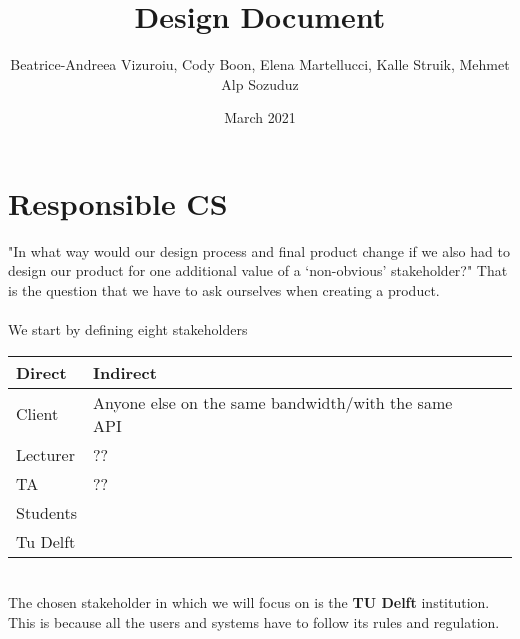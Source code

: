 \documentclass{article}
\title{Design Document}
\author{Beatrice-Andreea Vizuroiu, Cody Boon, Elena Martellucci, Kalle Struik, Mehmet Alp Sozuduz }
\date{March 2021}
\begin{document}
\maketitle

\section{Responsible CS}
"In what way would our design process and final product change if we also had to design our product for one additional value of a ‘non-obvious’ stakeholder?" That is the question that we have to ask ourselves when creating a product.\\
\\We start by defining eight stakeholders\\
\begin{center}
    \begin{tabular}{ | l | l | l | l | l |}
    \hline
    Direct    & Indirect \\ \hline \hline
    Client  & Anyone else on the same bandwidth/with the same API  \\ \hline
    Lecturer  &??  \\ \hline
    TA  &??  \\ \hline
    Students  &   \\ \hline
    Tu Delft  &   \\ \hline
    \end{tabular}
\end{center}

\\ The chosen stakeholder in which we will focus on is the \textbf{TU Delft} institution. This is because all the users and systems have to follow its rules and regulation. \\
\end{document}
